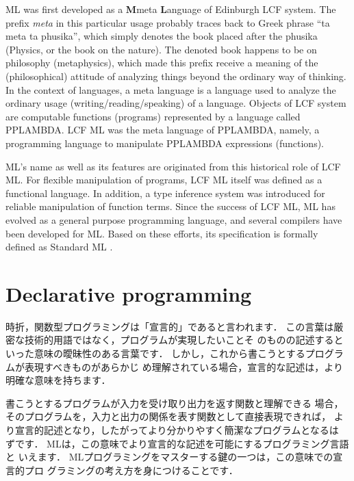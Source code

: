 \documentclass{jbook}
\newif\ifjp
\newcommand{\txt}[2]{#2}
\begin{document}
	ML was first developed as a {\bf M}meta {\bf L}anguage of
Edinburgh LCF\cite{gord79} system.
	The prefix {\em meta\/} in this particular usage probably traces
back to Greek phrase ``ta meta ta phusika'', which  simply denotes the
book placed after the phusika (Physics, or the book on the nature).
	The denoted book happens to be on philosophy (metaphysics), which
made this prefix receive a meaning of the (philosophical) attitude of
analyzing things beyond the ordinary way of thinking.
	In the context of languages, a meta language is a language used
to analyze the ordinary usage (writing/reading/speaking) of a language.
	Objects of LCF system are computable functions (programs)
represented by a language called PPLAMBDA.
	LCF ML was the meta language of PPLAMBDA, namely, a programming
language to manipulate PPLAMBDA expressions (functions).

	ML's name as well as its features are originated from this
historical role of LCF ML. 
	For flexible manipulation of programs, LCF ML itself was defined
as a functional language.
	In addition, a type inference system was introduced for reliable
manipulation of function terms.
	Since the success of LCF ML, ML has evolved as a general purpose
programming language, and several compilers have been developed for ML.
	Based on these efforts, its specification is formally defined as
Standard ML \cite{sml,sml97}.
\fi%


\section{\txt{宣言的プログラミング}{Declarative programming}}
\label{sec:tutorialDeclarative}

\ifjp%
	時折，関数型プログラミングは「宣言的」であると言われます．
	この言葉は厳密な技術的用語ではなく，プログラムが実現したいことそ
のものの記述するといった意味の曖昧性のある言葉です．
	しかし，これから書こうとするプログラムが表現すべきものがあらかじ
め理解されている場合，宣言的な記述は，より明確な意味を持ちます．
	
	書こうとするプログラムが入力を受け取り出力を返す関数と理解できる
場合，そのプログラムを，入力と出力の関係を表す関数として直接表現できれば，
より宣言的記述となり，したがってより分かりやすく簡潔なプログラムとなるは
ずです．
	MLは，この意味でより宣言的な記述を可能にするプログラミング言語と
いえます．
	MLプログラミングをマスターする鍵の一つは，この意味での宣言的プロ
グラミングの考え方を身につけることです．
\end{document}
